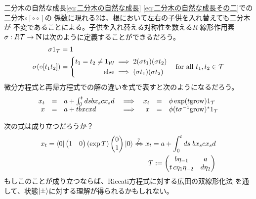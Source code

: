 {	二分木の自然な成長\eqref{eq:二分木の自然な成長}
	\eqref{eq:二分木の自然な成長その二}での二分木$\circ[\circ\circ]$の
	係数に現れる$2$は、根において左右の子供を入れ替えても二分木が
	不変であることによる。子供を入れ替える対称性を数える$R$-線形作用素
	$\sigma:R{{\mathcal{T}}}\to\mathbf{N}$は次のように定義することができるだろう。
	\begin{equation*}\begin{split}
		\sigma1_{{\mathcal{T}}} &= 1 \\
		\sigma(\circ[t_1t_2]) &= \left\{\begin{split}
			t_1 = t_2 \neq 1_{{\mathcal{W}}} & \implies 2(\sigma t_1)(\sigma t_2) \\
			\text{else} &\implies (\sigma t_1)(\sigma t_2) \\
		\end{split}\right. \quad\text{for all } t_1,t_2\in{\ensuremath{{\mathcal{T}}}} \\
	\end{split}\end{equation*}
	微分方程式と再帰方程式での解の違いを式で表すと次のようになるだろう。
	\begin{equation*}\begin{array}{rclcrcl}
		x_t &=& a + \int_0^tdsbx_scx_sd
			&\implies& x_t &=& \phi\exp(t{\operatorname{grow}})1_{{\mathcal{T}}} \\
		x &=& a + tbxcxd
			&\implies& x &=& \phi(t\sigma^{-1}{\operatorname{grow}})^*1_{{\mathcal{T}}} \\
	\end{array}\end{equation*}

	\begin{problem}[微分方程式の解]\label{prob:微分方程式の解} %
		次の式は成り立つだろうか？
		\begin{equation*}\begin{split}
			x_t = \bra{0}\begin{pmatrix}
				1 & 0
			\end{pmatrix}(\exp T)\begin{pmatrix}
				0 \\ 1
			\end{pmatrix}\ket{0} \xiff{?} x_t = a + \int_0^tds\; bx_scx_sd \\
			T: = \begin{pmatrix}
				b\eta_{-1} & a \\ t\,c\eta_{1}\eta_{-2} & d\eta_{2} \\
			\end{pmatrix}
		\end{split}\end{equation*}
		もしこのことが成り立つならば、Riccati方程式に対する広田の双線形化法
		を通して、状態$\mathinner{|{\pm}\rangle}$に対する理解が得られるかもしれない。


\end{problem}}
